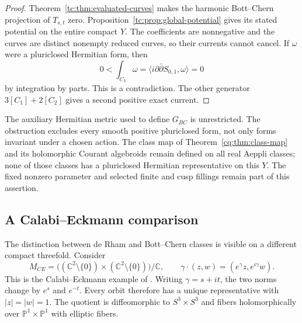 \begin{proof}
Theorem~\ref{tc:thm:evaluated-curves} makes the harmonic
Bott--Chern projection of $T_{s,t}$ zero.
Proposition~\ref{tc:prop:global-potential} gives its stated
potential on the entire compact $Y$.
The coefficients are nonnegative and the curves are distinct
nonempty reduced curves, so their currents cannot cancel.
If $\omega$ were a pluriclosed Hermitian form, then
\[
 0<\int_{C_3}\omega
    =\langle i\partial\bar\partial S_{0,1},\omega\rangle
    =0
\]
by integration by parts. This is a contradiction.
The other generator $3[C_1]+2[C_2]$ gives a second positive
exact current.
\end{proof}

The auxiliary Hermitian metric used to define $G_{BC}$ is
unrestricted. The obstruction excludes every smooth positive
pluriclosed form, not only forms invariant under a chosen action.
The class map of Theorem~\ref{cq:thm:class-map} and its
holomorphic Courant algebroids remain defined on all real
Aeppli classes; none of those classes has a pluriclosed
Hermitian representative on this $Y$.
The fixed nonzero parameter and selected finite and cusp
fillings remain part of this assertion.

\subsection{A Calabi--Eckmann comparison}

The distinction between de Rham and Bott--Chern classes is
visible on a different compact threefold.
Consider
\begin{equation}\label{tc:eq:CE-quotient}
 M_{CE}=
 \bigl((\mathbb C^2\setminus\{0\})\times
       (\mathbb C^2\setminus\{0\})\bigr)/\mathbb C,
 \qquad
 \gamma\cdot(z,w)=(e^\gamma z,e^{i\gamma}w).
\end{equation}
This is the Calabi--Eckmann example of
\cite[Example~2.8]{GFJSCourant}.
Writing $\gamma=s+it$, the two norms change by $e^s$ and
$e^{-t}$. Every orbit therefore has a unique representative
with $|z|=|w|=1$. The quotient is diffeomorphic to
$S^3\times S^3$ and fibers holomorphically over
$\mathbb P^1\times\mathbb P^1$ with elliptic fibers.

